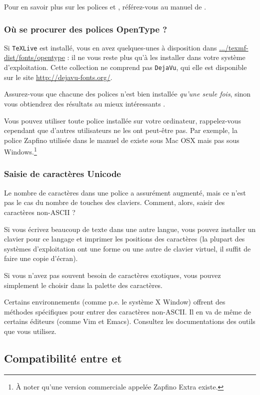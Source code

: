 Pour en savoir plus sur les polices et , référez-vous
au manuel de .

\subsubsection{Où se procurer des polices OpenType ?}

Si \texttt{TeXLive} est installé, vous en avez quelques-unes à
disposition dans \url{.../texmf-dist/fonts/opentype} : il ne vous
reste plus qu'à les installer dans votre système d'exploitation. Cette
collection ne comprend pas \texttt{DejaVu}, qui elle est disponible
sur le site \url{http://dejavu-fonts.org/}.

Assurez-vous que chacune des polices n'est bien installée \emph{qu'une
seule fois}, sinon vous obtiendrez des résultats au mieux \og
intéressants \fg.

Vous pouvez utiliser toute police installée sur votre ordinateur,
rappelez-vous cependant que d'autres utilisateurs ne les ont peut-être
pas. Par exemple, la police Zapfino utilisée dans le manuel de
 existe sous Mac OSX mais pas sous Windows.\footnote{À
  noter qu'une version commerciale appelée Zapfino Extra existe.}

\subsubsection{Saisie de caractères Unicode}

Le nombre de caractères dans une police a assurément augmenté, mais ce
n'est pas le cas du nombre de touches des claviers. Comment, alors,
saisir des caractères non-ASCII ?

Si vous écrivez beaucoup de texte dans une autre langue, vous pouvez
installer un clavier pour ce langage et imprimer les positions des
caractères (la plupart des systèmes d'exploitation ont une forme ou
une autre de clavier virtuel, il suffit de faire une copie d'écran).

Si vous n'avez pas souvent besoin de caractères exotiques, vous pouvez
simplement le choisir dans la palette des caractères.

Certains environnements (comme p.e. le système X Window) offrent des
méthodes spécifiques pour entrer des caractères non-ASCII. Il en va de
même de certains éditeurs (comme Vim et Emacs). Consultez les
documentations des outils que vous utilisez.

\subsection{Compatibilité entre  et }
\label{sec:comp-entre-holog}

